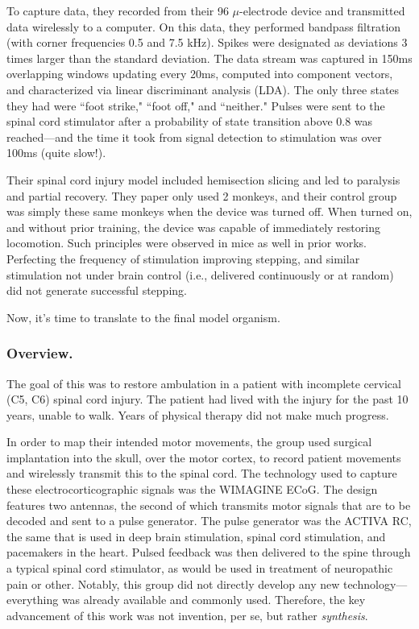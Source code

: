 To capture data, they recorded from their 96 $\mu$-electrode device and transmitted data wirelessly to a computer. On this data, they performed bandpass filtration (with corner frequencies 0.5 and 7.5 kHz). Spikes were designated as deviations 3 times larger than the standard deviation. The data stream was captured in 150ms overlapping windows updating every 20ms, computed into component vectors, and characterized via linear discriminant analysis (LDA). The only three states they had were ``foot strike," ``foot off," and ``neither." Pulses were sent to the spinal cord stimulator after a probability of state transition above 0.8 was reached---and the time it took from signal detection to stimulation was over 100ms (quite slow!).\newline

Their spinal cord injury model included hemisection slicing and led to paralysis and partial recovery. They paper only used 2 monkeys, and their control group was simply these same monkeys when the device was turned off. When turned on, and without prior training, the device was capable of immediately restoring locomotion. Such principles were observed in mice as well in prior works. Perfecting the frequency of stimulation improving stepping, and similar stimulation not under brain control (i.e., delivered continuously or at random) did not generate successful stepping.  \newline

Now, it's time to translate to the final model organism.

\subsubsection{Overview.} 

The goal of this was to restore ambulation in a patient with incomplete cervical (C5, C6) spinal cord injury. The patient had lived with the injury for the past 10 years, unable to walk. Years of physical therapy did not make much progress.\newline 

In order to map their intended motor movements, the group used surgical implantation into the skull, over the motor cortex, to record patient movements and wirelessly transmit this to the spinal cord. The technology used to capture these electrocorticographic signals was the WIMAGINE ECoG. The design features two antennas, the second of which transmits motor signals that are to be decoded and sent to a pulse generator. The pulse generator was the ACTIVA RC, the same that is used in deep brain stimulation, spinal cord stimulation, and pacemakers in the heart. Pulsed feedback was then delivered to the spine through a typical spinal cord stimulator, as would be used in treatment of neuropathic pain or other. Notably, this group did not directly develop any new technology---everything was already available and commonly used. Therefore, the key advancement of this work was not invention, per se, but rather \textit{synthesis}. 

